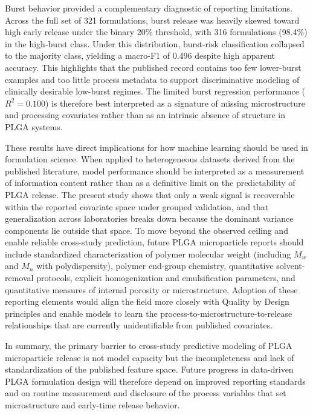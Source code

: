 \documentclass[preprint,12pt,authoryear]{elsarticle}
\begin{document}
Burst behavior provided a complementary diagnostic of reporting limitations. Across the full set of 321 formulations, burst release was heavily skewed toward high early release under the binary $20\%$ threshold, with 316 formulations (98.4\%) in the high-burst class. Under this distribution, burst-risk classification collapsed to the majority class, yielding a macro-F1 of 0.496 despite high apparent accuracy. This highlights that the published record contains too few lower-burst examples and too little process metadata to support discriminative modeling of clinically desirable low-burst regimes. The limited burst regression performance ($R^2 = 0.100$) is therefore best interpreted as a signature of missing microstructure and processing covariates rather than as an intrinsic absence of structure in PLGA systems.

These results have direct implications for how machine learning should be used in formulation science. When applied to heterogeneous datasets derived from the published literature, model performance should be interpreted as a measurement of information content rather than as a definitive limit on the predictability of PLGA release. The present study shows that only a weak signal is recoverable within the reported covariate space under grouped validation, and that generalization across laboratories breaks down because the dominant variance components lie outside that space. To move beyond the observed ceiling and enable reliable cross-study prediction, future PLGA microparticle reports should include standardized characterization of polymer molecular weight (including $M_w$ and $M_n$ with polydispersity), polymer end-group chemistry, quantitative solvent-removal protocols, explicit homogenization and emulsification parameters, and quantitative measures of internal porosity or microstructure. Adoption of these reporting elements would align the field more closely with Quality by Design principles and enable models to learn the process-to-microstructure-to-release relationships that are currently unidentifiable from published covariates.

In summary, the primary barrier to cross-study predictive modeling of PLGA microparticle release is not model capacity but the incompleteness and lack of standardization of the published feature space. Future progress in data-driven PLGA formulation design will therefore depend on improved reporting standards and on routine measurement and disclosure of the process variables that set microstructure and early-time release behavior.
\end{document}
